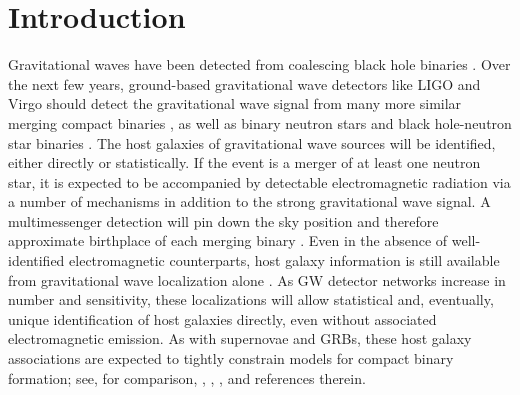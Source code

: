\documentclass[a4paper,fleqn,usenatbib]{mnras}
\begin{document}
\section{Introduction}
Gravitational waves have been detected from  coalescing  black hole binaries \citep{DiscoveryPaper,LIGO-O1-BBH}. 
Over the next few years, ground-based gravitational wave detectors like LIGO 
and Virgo  should detect the gravitational
wave signal from many more similar merging compact binaries \citep{LIGO-O1-BBH,RatesPaper,gwastro-EventPopsynPaper-2016}, as well as  binary  neutron stars and black hole-neutron star binaries \citep{LIGO-Inspiral-Rates,popsyn-LowMetallicityImpact2c-StarTrackRevised-2014}.
%
The host galaxies of gravitational wave sources will be identified, either directly or statistically.  
If the event is a merger of at least one neutron star, it is expected to be accompanied by detectable
electromagnetic radiation  via a number of  mechanisms \citep[see][and references therein]{Metzger16} in addition to the strong gravitational wave signal. %
A multimessenger detection will pin down
the sky position and therefore approximate birthplace of each merging binary \citep{Nissanke13}.    
%
Even in the absence of well-identified electromagnetic counterparts, host galaxy information is still available from gravitational wave localization alone \citep{2016LRR....19....1A,2016arXiv160307333S}.  As GW detector
networks increase in number and sensitivity, these localizations will allow statistical and, eventually, unique identification of
host galaxies directly, even without associated electromagnetic emission.
%
As with supernovae and  GRBs, these host galaxy associations   are expected to tightly constrain models for compact binary
formation; see, for comparison,  \citet{2011MNRAS.412.1508M}, \citet{long-grb-GuettaPiran2007},
\citet{2014ARAA..52...43B}, and references therein. %
%
\end{document}
